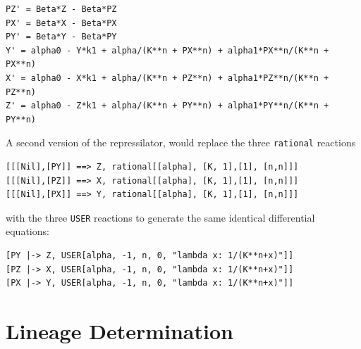 \begin{center}
\begin{minipage}{4.5in}
\begin{scriptsize}
\begin{Verbatim}[frame=single]
PZ' = Beta*Z - Beta*PZ
PX' = Beta*X - Beta*PX
PY' = Beta*Y - Beta*PY
Y' = alpha0 - Y*k1 + alpha/(K**n + PX**n) + alpha1*PX**n/(K**n + PX**n)
X' = alpha0 - X*k1 + alpha/(K**n + PZ**n) + alpha1*PZ**n/(K**n + PZ**n)
Z' = alpha0 - Z*k1 + alpha/(K**n + PY**n) + alpha1*PY**n/(K**n + PY**n)
\end{Verbatim}
\end{scriptsize}
\end{minipage}
\end{center}

A second version of the repressilator, would replace the three {\tt rational} reactions 

\begin{Verbatim}[frame=single]
[[[Nil],[PY]] ==> Z, rational[[alpha], [K, 1],[1], [n,n]]]
[[[Nil],[PZ]] ==> X, rational[[alpha], [K, 1],[1], [n,n]]]
[[[Nil],[PX]] ==> Y, rational[[alpha], [K, 1],[1], [n,n]]]
\end{Verbatim}

with the three {\tt USER} reactions to generate the same identical differential equations:

\begin{Verbatim}[frame=single]
[PY |-> Z, USER[alpha, -1, n, 0, "lambda x: 1/(K**n+x)"]]
[PZ |-> X, USER[alpha, -1, n, 0, "lambda x: 1/(K**n+x)"]]
[PX |-> Y, USER[alpha, -1, n, 0, "lambda x: 1/(K**n+x)"]]
\end{Verbatim}

\newpage
\section{Lineage Determination}

